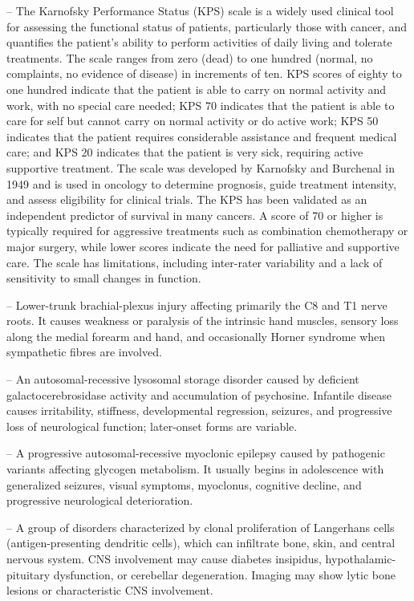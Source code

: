 -- The Karnofsky Performance Status (KPS) scale is a widely used clinical tool for assessing the functional status of patients, particularly those with cancer, and quantifies the patient's ability to perform activities of daily living and tolerate treatments. The scale ranges from zero (dead) to one hundred (normal, no complaints, no evidence of disease) in increments of ten. KPS scores of eighty to one hundred indicate that the patient is able to carry on normal activity and work, with no special care needed; KPS 70 indicates that the patient is able to care for self but cannot carry on normal activity or do active work; KPS 50 indicates that the patient requires considerable assistance and frequent medical care; and KPS 20 indicates that the patient is very sick, requiring active supportive treatment. The scale was developed by Karnofsky and Burchenal in 1949 and is used in oncology to determine prognosis, guide treatment intensity, and assess eligibility for clinical trials. The KPS has been validated as an independent predictor of survival in many cancers. A score of 70 or higher is typically required for aggressive treatments such as combination chemotherapy or major surgery, while lower scores indicate the need for palliative and supportive care. The scale has limitations, including inter-rater variability and a lack of sensitivity to small changes in function.

-- Lower-trunk brachial-plexus injury affecting primarily the C8 and T1 nerve roots. It causes weakness or paralysis of the intrinsic hand muscles, sensory loss along the medial forearm and hand, and occasionally Horner syndrome when sympathetic fibres are involved.

-- An autosomal-recessive lysosomal storage disorder caused by deficient galactocerebrosidase activity and accumulation of psychosine. Infantile disease causes irritability, stiffness, developmental regression, seizures, and progressive loss of neurological function; later-onset forms are variable.

-- A progressive autosomal-recessive myoclonic epilepsy caused by pathogenic variants affecting glycogen metabolism. It usually begins in adolescence with generalized seizures, visual symptoms, myoclonus, cognitive decline, and progressive neurological deterioration.

-- A group of disorders characterized by clonal proliferation of Langerhans cells (antigen-presenting dendritic cells), which can infiltrate bone, skin, and central nervous system. CNS involvement may cause diabetes insipidus, hypothalamic-pituitary dysfunction, or cerebellar degeneration. Imaging may show lytic bone lesions or characteristic CNS involvement.

